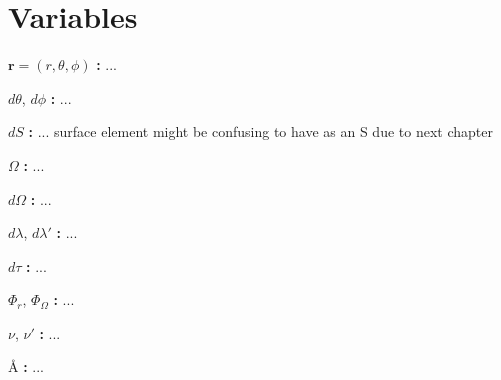\section{Variables}

\noindent ${\mathbf{r}}=(r,{\theta},{\phi})$ \textbf{:}
...

\noindent ${d\theta}$, ${d\phi}$ \textbf{:}
...

\noindent ${dS}$ \textbf{:}
... surface element might be confusing to have as an S due to next chapter

\noindent ${\Omega}$ \textbf{:}
...

\noindent ${d\Omega}$ \textbf{:}
...

\noindent ${d\lambda}$, ${d\lambda{'}}$ \textbf{:}
...

\noindent ${d\tau}$ \textbf{:}
...

\noindent ${\Phi_{r}}$, ${\Phi_\Omega}$ \textbf{:}
...

\noindent ${\nu}$, ${\nu{'}}$ \textbf{:}
...

\noindent ${\text{\AA}}$ \textbf{:}
...
